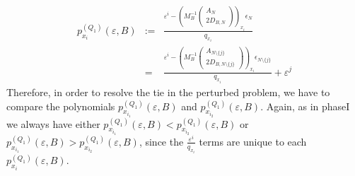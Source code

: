 \documentclass[a4paper]{article}
\newcommand{\px}[3]{\ensuremath{p_{x_{#1}}^{(#2)}(\varepsilon, #3)}}
\begin{document}
\begin{eqnarray}
\label{def:p_x_i_Q_1}
\px{i}{Q_{1}}{B} &:=&
  \frac{\varepsilon^{i} -
         \left(M_{B}^{-1}
           \left(\begin{array}{c}
                    A_{N}  \\
	            \hline
	            2D_{B, N}
	         \end{array}
	   \right)
         \right)_{x_{i}}\epsilon_{N}}{q_{x_{i}}} \\
  &=&
    \frac{\varepsilon^{i} -
         \left(M_{B}^{-1}
           \left(\begin{array}{c}
                    A_{N \setminus \{j\}}  \\
	            \hline
	            2D_{B, N \setminus \{j\}}
	         \end{array}
	   \right)
         \right)_{x_{i}}\epsilon_{N \setminus \{j\}}}{q_{x_{i}}}
	 + \varepsilon^{j}
\end{eqnarray}
Therefore, in order to resolve the tie in the perturbed problem, we have 
to compare the polynomials \px{i_{1}}{Q_{1}}{B} and \px{i_{2}}{Q_{1}}{B}.
Again, as in phaseI we always have either
$\px{i_{1}}{Q_{1}}{B} < \px{i_{2}}{Q_{1}}{B}$ or
$\px{i_{1}}{Q_{1}}{B} > \px{i_{2}}{Q_{1}}{B}$, since the
$\frac{\varepsilon^{i}}{q_{x_{i}}}$ terms are unique to each
\px{i}{Q_{1}}{B}.
\end{document}
